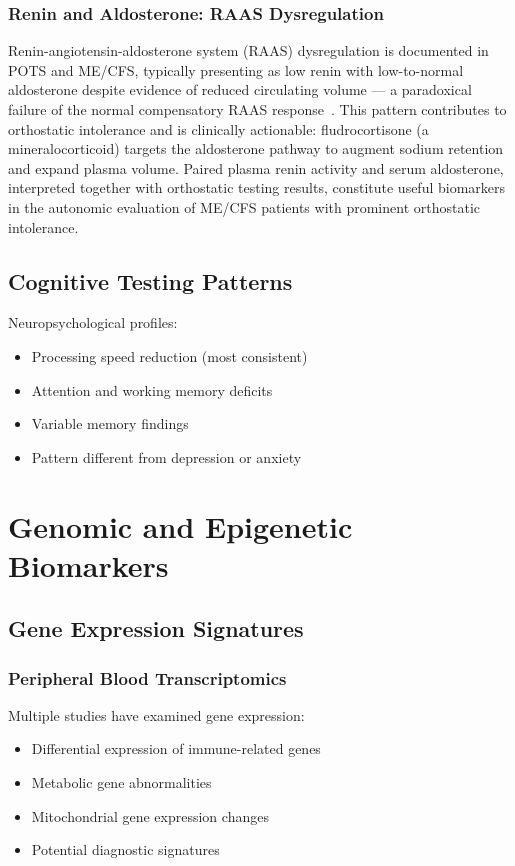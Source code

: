\subsubsection{Renin and Aldosterone: RAAS Dysregulation}

Renin-angiotensin-aldosterone system (RAAS) dysregulation is documented in POTS and ME/CFS, typically presenting as low renin with low-to-normal aldosterone despite evidence of reduced circulating volume --- a paradoxical failure of the normal compensatory RAAS response~\cite{Miwa2017,Raj2005}. This pattern contributes to orthostatic intolerance and is clinically actionable: fludrocortisone (a mineralocorticoid) targets the aldosterone pathway to augment sodium retention and expand plasma volume. Paired plasma renin activity and serum aldosterone, interpreted together with orthostatic testing results, constitute useful biomarkers in the autonomic evaluation of ME/CFS patients with prominent orthostatic intolerance.

\subsection{Cognitive Testing Patterns}

Neuropsychological profiles:
\begin{itemize}
    \item Processing speed reduction (most consistent)
    \item Attention and working memory deficits
    \item Variable memory findings
    \item Pattern different from depression or anxiety
\end{itemize}

\section{Genomic and Epigenetic Biomarkers}
\label{sec:genomic-biomarkers}

\subsection{Gene Expression Signatures}

\subsubsection{Peripheral Blood Transcriptomics}
Multiple studies have examined gene expression:
\begin{itemize}
    \item Differential expression of immune-related genes
    \item Metabolic gene abnormalities
    \item Mitochondrial gene expression changes
    \item Potential diagnostic signatures
\end{itemize}

